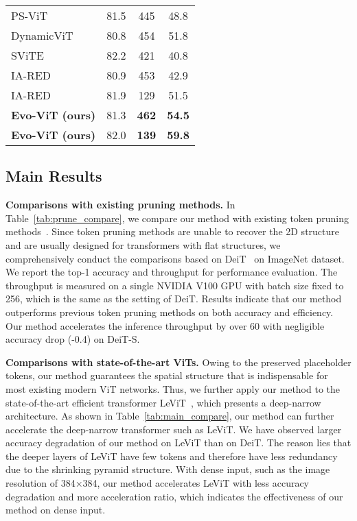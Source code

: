 \documentclass[letterpaper]{article} \usepackage{aaai22}  \usepackage{times}  \usepackage{helvet}  \usepackage{courier}  \usepackage[hyphens]{url}  \usepackage{graphicx} \urlstyle{rm} \def\UrlFont{\rm}  \usepackage{natbib}  \usepackage{caption} \DeclareCaptionStyle{ruled}{labelfont=normalfont,labelsep=colon,strut=off} \frenchspacing  \setlength{\pdfpagewidth}{8.5in}  \setlength{\pdfpageheight}{11in}  \usepackage{algorithm}
\begin{document}
\begin{table}
{{\begin{tabular}{l|ccc}
    PS-ViT~\cite{PatchSlimming}     &      81.5       &                445        &       48.8      \\
    DynamicViT~\cite{DynamicViT}    &      80.8       &                454        &       51.8      \\
    SViTE~\cite{SViTE}              &      82.2   &                 421        &       40.8      \\
    IA-RED~\cite{IA-RED2}       &      80.9       &                453        &       42.9      \\
    IA-RED~\cite{IA-RED2}    &      81.9       &                129        &       51.5      \\
    \textbf{Evo-ViT (ours) }        &      81.3       &      \textbf{462}        &       \textbf{54.5} \\
    \textbf{Evo-ViT (ours)}   &      82.0       &                \textbf{139}        &       \textbf{59.8}      \\
    \bottomrule
    \end{tabular}
    }
    }
    \vspace{-3mm}
\end{table} 
\subsection{Main Results}
\noindent\textbf{Comparisons with existing pruning methods.}
In Table~\ref{tab:prune_compare}, we compare our method with existing token pruning methods~\cite{DynamicViT,IA-RED2,PatchSlimming,SViTE}. Since token pruning methods are unable to recover the 2D structure and are usually designed for transformers with flat structures, we comprehensively conduct the comparisons based on DeiT~\cite{DeiT} on ImageNet dataset. We report the top-1 accuracy and throughput for performance evaluation. The throughput is measured on a single NVIDIA V100 GPU with batch size fixed to 256, which is the same as the setting of DeiT. Results indicate that our method outperforms previous token pruning methods on both accuracy and efficiency. Our method accelerates the inference throughput by over 60 with negligible accuracy drop (-0.4) on DeiT-S.

\noindent\textbf{Comparisons with state-of-the-art ViTs.}
Owing to the preserved placeholder tokens, our method guarantees the spatial structure that is indispensable for most existing modern ViT networks. Thus, we further apply our method to the state-of-the-art efficient transformer LeViT~\cite{LeViT}, which presents a deep-narrow architecture. As shown in Table~\ref{tab:main_compare}, our method can further accelerate the deep-narrow transformer such as LeViT. We have observed larger accuracy degradation of our method on LeViT than on DeiT. The reason lies that the deeper layers of LeViT have few tokens and therefore have less redundancy due to the shrinking pyramid structure. With dense input, such as the image resolution of 384×384, our method accelerates LeViT with less accuracy degradation and more acceleration ratio, which indicates the effectiveness of our method on dense input.
\end{document}
